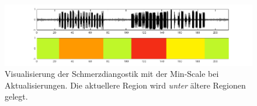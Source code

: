 \begin{itemize}
\begin{figure}[h]
	\centering
	\includegraphics[width=1\textwidth]{bilder/viz_act_under.png}
	\caption{Visualisierung der Schmerzdiangostik mit der Min-Scale bei Aktualisierungen. Die aktuellere Region wird \emph{unter} ältere Regionen gelegt.}
	\label{fig:viz_act_under}
\end{figure}
 
\end{itemize}
